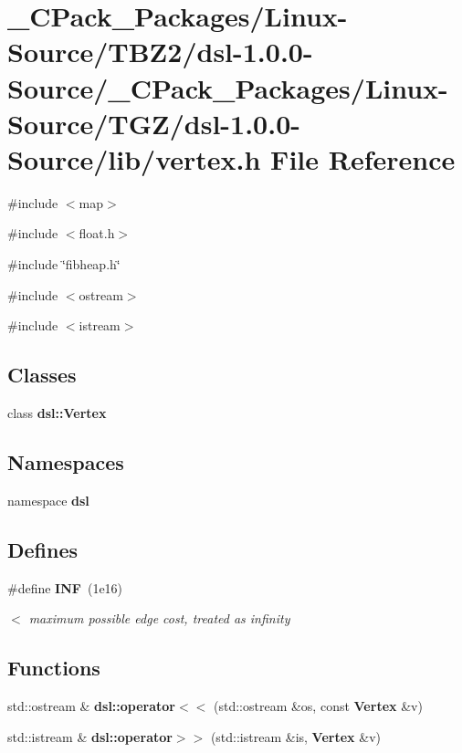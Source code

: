 \section{\_\-CPack\_\-Packages/Linux-\/Source/TBZ2/dsl-\/1.0.0-\/Source/\_\-CPack\_\-Packages/Linux-\/Source/TGZ/dsl-\/1.0.0-\/Source/lib/vertex.h File Reference}
\label{__CPack__Packages_2Linux-Source_2TBZ2_2dsl-1_80_80-Source_2__CPack__Packages_2Linux-Source_2TGZ_6e62bfc44f65a27c3c4dc86196de4431}
{\ttfamily \#include $<$map$>$}\par
{\ttfamily \#include $<$float.h$>$}\par
{\ttfamily \#include \char`\"{}fibheap.h\char`\"{}}\par
{\ttfamily \#include $<$ostream$>$}\par
{\ttfamily \#include $<$istream$>$}\par
\subsection*{Classes}
\begin{DoxyCompactItemize}
\item 
class {\bf dsl::Vertex}
\end{DoxyCompactItemize}
\subsection*{Namespaces}
\begin{DoxyCompactItemize}
\item 
namespace {\bf dsl}
\end{DoxyCompactItemize}
\subsection*{Defines}
\begin{DoxyCompactItemize}
\item 
\#define {\bf INF}~(1e16)
\begin{DoxyCompactList}\small\item\em $<$ maximum possible edge cost, treated as infinity \item\end{DoxyCompactList}\end{DoxyCompactItemize}
\subsection*{Functions}
\begin{DoxyCompactItemize}
\item 
std::ostream \& {\bf dsl::operator$<$$<$} (std::ostream \&os, const {\bf Vertex} \&v)
\item 
std::istream \& {\bf dsl::operator$>$$>$} (std::istream \&is, {\bf Vertex} \&v)
\end{DoxyCompactItemize}


